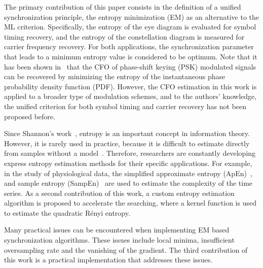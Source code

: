 \documentclass[12pt, draftclsnofoot, onecolumn]{IEEEtran}
\begin{document}
The primary contribution of this paper consists in the definition of a unified synchronization principle, the entropy minimization (EM) as an alternative to the ML criterion. 
Specifically, the entropy of the eye diagram is evaluated for symbol timing recovery, and the entropy of the constellation diagram is measured for carrier frequency recovery.
For both applications, the synchronization parameter that leads to a minimum entropy value is considered to be optimum.
Note that it has been shown in~\cite{Pedzisz2006} that the CFO of phase-shift keying (PSK) modulated signals can be recovered by minimizing the entropy of the instantaneous phase probability density function (PDF).
However, the CFO estimation in this work is applied to a broader type of modulation schemes, and to the authors' knowledge, the unified criterion for both symbol timing and carrier recovery has not been proposed before. 

Since Shannon's work~\cite{Shannon1948}, entropy is an important concept in information theory. 
However, it is rarely used in practice, because it is difficult to estimate directly from samples without a model~\cite{Bercher2000}.
Therefore, researchers are constantly developing express entropy estimation methods for their specific applications.
For example, in the study of physiological data, the simplified approximate entropy (ApEn)~\cite{Pincus1991}, and sample entropy (SampEn)~\cite{Richman2000} are used to estimate the complexity of the time series.
As a second contribution of this work, a custom entropy estimation algorithm is proposed to accelerate the searching,
where a kernel function is used to estimate the quadratic R\'enyi entropy.

Many practical issues can be encountered when implementing EM based synchronization algorithms.
These issues include local minima, insufficient oversampling rate and the vanishing of the gradient.
The third contribution of this work is a practical implementation that addresses these issues.
\end{document}
